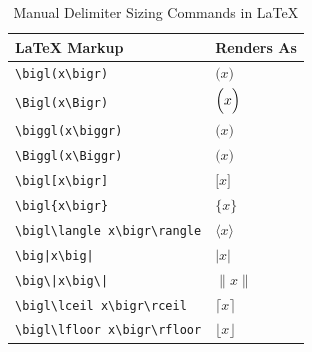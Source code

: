 \documentclass[12pt,letterpaper]{article}
\begin{document}
	\begin{table}[h]
		\centering
		\begin{tabular}{|p{7cm}|p{5cm}|}
			\hline
			\textbf{LaTeX Markup} & \textbf{Renders As} \\
			\hline
			
			\texttt{\textbackslash bigl(x\textbackslash bigr)}
			&
			$\bigl(x\bigr)$
			\\
			\hline
			
			\texttt{\textbackslash Bigl(x\textbackslash Bigr)}
			&
			$\Bigl(x\Bigr)$
			\\
			\hline
			
			\texttt{\textbackslash biggl(x\textbackslash biggr)}
			&
			$\biggl(x\biggr)$
			\\
			\hline
			
			\texttt{\textbackslash Biggl(x\textbackslash Biggr)}
			&
			$\Biggl(x\Biggr)$
			\\
			\hline
			
			\texttt{\textbackslash bigl[x\textbackslash bigr]}
			&
			$\bigl[x\bigr]$
			\\
			\hline
			
			\texttt{\textbackslash bigl\{x\textbackslash bigr\}}
			&
			$\bigl\{x\bigr\}$
			\\
			\hline
			
			\texttt{\textbackslash bigl\textbackslash langle x\textbackslash bigr\textbackslash rangle}
			&
			$\bigl\langle x\bigr\rangle$
			\\
			\hline
			
			\texttt{\textbackslash big|x\textbackslash big|}
			&
			$\big|x\big|$
			\\
			\hline
			
			\texttt{\textbackslash big\textbackslash |x\textbackslash big\textbackslash |}
			&
			$\big\|x\big\|$
			\\
			\hline
			
			\texttt{\textbackslash bigl\textbackslash lceil x\textbackslash bigr\textbackslash rceil}
			&
			$\bigl\lceil x\bigr\rceil$
			\\
			\hline
			
			\texttt{\textbackslash bigl\textbackslash lfloor x\textbackslash bigr\textbackslash rfloor}
			&
			$\bigl\lfloor x\bigr\rfloor$
			\\
			\hline
			
		\end{tabular}
		
		\caption{Manual Delimiter Sizing Commands in LaTeX}
		
	\end{table}
\end{document}
